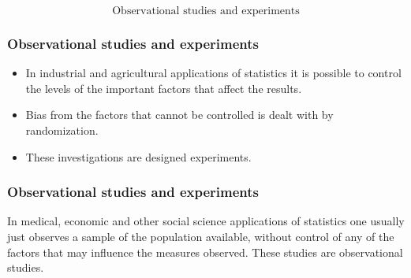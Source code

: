 \documentclass{beamer}
\begin{document}
\begin{frame}
\huge
\[\mbox{Observational studies and experiments}\]
\end{frame}
\begin{frame}
\frametitle{Observational studies and experiments}
\begin{itemize}
\item In industrial and agricultural applications of statistics it is possible to control the
levels of the important factors that affect the results. \item  Bias from the factors that cannot
be controlled is dealt with by randomization. \item These investigations are designed
experiments. 
\end{itemize}
\end{frame}
\begin{frame}
\frametitle{Observational studies and experiments}
\Large
In medical, economic and other social science applications of statistics
one usually just observes a sample of the population available, without control of any
of the factors that may influence the measures observed. These studies are
observational studies.
\end{frame}
\end{document}
